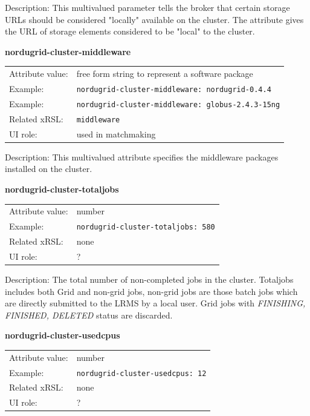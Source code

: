 \documentclass{article}
\begin{document}
Description: This multivalued parameter tells the broker that certain storage URLs
should be considered "locally" available on the cluster.
The attribute gives the URL of storage elements considered to be "local" to the cluster.


  \hspace*{0.5cm}
  \begin{shaded}
    \textbf{nordugrid-cluster-middleware}
  \end{shaded}
  \begin{tabular}{lp{10cm}}  
    Attribute value:& free form string to represent a software package\\
    Example:& \verb#nordugrid-cluster-middleware: nordugrid-0.4.4#\\
    Example:& \verb#nordugrid-cluster-middleware: globus-2.4.3-15ng#\\
    Related xRSL:& \verb#middleware#\\
    UI role:& used in matchmaking\\
  \end{tabular}

Description: This multivalued attribute specifies the middleware packages 
installed on the cluster. 


  \hspace*{0.5cm}
  \begin{shaded}
    \textbf{nordugrid-cluster-totaljobs}
  \end{shaded}
  \begin{tabular}{lp{10cm}}  
    Attribute value:& number\\
    Example:& \verb#nordugrid-cluster-totaljobs: 580#\\
    Related xRSL:& none\\
    UI role:& ? \\
  \end{tabular}

Description: The total number of non-completed jobs in the cluster.
Totaljobs includes both Grid and non-grid jobs, non-grid jobs are
those batch jobs which are directly submitted to the LRMS by a local user.
Grid jobs with {\it FINISHING, FINISHED, DELETED} status are discarded.


  \hspace*{0.5cm}
  \begin{shaded}
    \textbf{nordugrid-cluster-usedcpus}
  \end{shaded}
  \begin{tabular}{lp{10cm}}  
    Attribute value:& number\\
    Example:& \verb#nordugrid-cluster-usedcpus: 12#\\
    Related xRSL:& none\\
    UI role:& ?\\ 
  \end{tabular}
\end{document}
